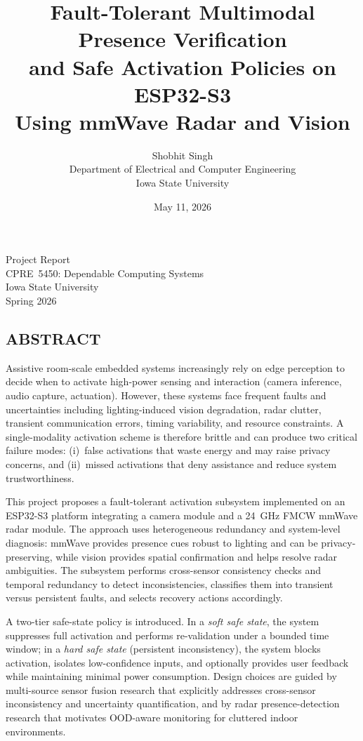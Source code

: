 \documentclass[12pt]{extarticle}
\title{\textbf{Fault-Tolerant Multimodal Presence Verification}\\[6pt]
       \textbf{and Safe Activation Policies on ESP32-S3}\\[6pt]
       \textbf{Using mmWave Radar and Vision}}
\author{Shobhit Singh\\[10pt]
        \normalsize Department of Electrical and Computer Engineering\\
        Iowa State University}
\date{May 11, 2026}
\begin{document}
\maketitle
\thispagestyle{empty}
\vfill
{\centering \LARGE
  Project Report\\
  CPRE~5450: Dependable Computing Systems\\[12pt]
  Iowa State University\\
  Spring 2026
\par}
\vspace*{0.8in}

\clearpage
\subsection*{\centering \normalfont ABSTRACT}
{\large
Assistive room-scale embedded systems increasingly rely on edge perception to decide when to
activate high-power sensing and interaction (camera inference, audio capture, actuation).
However, these systems face frequent faults and uncertainties including lighting-induced
vision degradation, radar clutter, transient communication errors, timing variability, and
resource constraints.
A single-modality activation scheme is therefore brittle and can produce two critical
failure modes: (i)~false activations that waste energy and may raise privacy concerns,
and (ii)~missed activations that deny assistance and reduce system trustworthiness.

This project proposes a fault-tolerant activation subsystem implemented on an ESP32-S3
platform integrating a camera module and a 24~GHz FMCW mmWave radar module.
The approach uses heterogeneous redundancy and system-level diagnosis: mmWave provides
presence cues robust to lighting and can be privacy-preserving, while vision provides
spatial confirmation and helps resolve radar ambiguities.
The subsystem performs cross-sensor consistency checks and temporal redundancy to detect
inconsistencies, classifies them into transient versus persistent faults, and selects
recovery actions accordingly.

A two-tier safe-state policy is introduced.
In a \emph{soft safe state}, the system suppresses full activation and performs
re-validation under a bounded time window; in a \emph{hard safe state} (persistent
inconsistency), the system blocks activation, isolates low-confidence inputs, and
optionally provides user feedback while maintaining minimal power consumption.
Design choices are guided by multi-source sensor fusion research that explicitly
addresses cross-sensor inconsistency and uncertainty quantification, and by radar
presence-detection research that motivates OOD-aware monitoring for cluttered indoor
environments.

}
\end{document}
